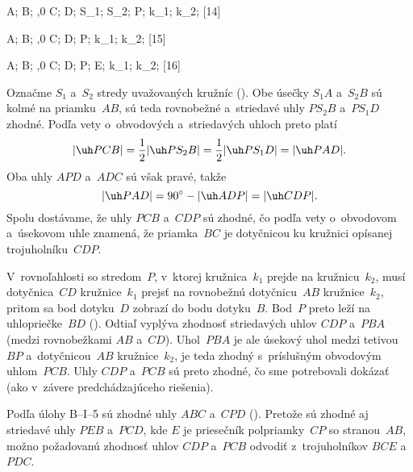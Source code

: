 {%
\fontplace
\tpoint A; \tpoint B; \bpoint{},0 C; \bpoint D;
\rpoint S_1; \lBpoint S_2; \tlpoint P;
\tlpoint k_1; \tlpoint k_2;
[14] \hfil\Obr

\fontplace
\tpoint A; \tpoint B; \bpoint{},0 C; \bpoint D;
\trpoint P;
\tlpoint k_1; \tlpoint k_2;
[15] \hfil\Obr

\fontplace
\tpoint A; \tpoint B; \bpoint{},0 C; \bpoint D;
\lpoint P; \tpoint E;
\tlpoint k_1; \tlpoint k_2;
[16] \hfil\Obr

Označme $S_1$ a~$S_2$ stredy uvažovaných kružníc
(\obr). Obe úsečky $S_1A$ a~$S_2B$ sú kolmé na priamku~$AB$,
\inspicture{}
sú teda rovnobežné a~striedavé uhly $PS_2B$ a~$PS_1D$
zhodné. Podľa vety 
o~obvodových a~striedavých uhloch preto platí
$$
|\uh PCB|=\frac12|\uh PS_2B|=\frac12|\uh PS_1D|=|\uh PAD|.
$$
Oba uhly $APD$ a~$ADC$ sú však pravé, takže
$$
|\uh PAD|=90^{\circ}-|\uh ADP|=|\uh CDP|.
$$
Spolu dostávame, že uhly $PCB$ a~$CDP$ sú zhodné, čo podľa
vety o~obvodovom a~úsekovom uhle znamená, že priamka~$BC$ je
dotyčnicou ku kružnici opísanej trojuholníku~$CDP$.

\ineriesenie
V~rovnoľahlosti so stredom~$P$, v~ktorej
kružnica~$k_1$ prejde na kružnicu~$k_2$, musí dotyčnica~$CD$
kružnice~$k_1$ prejsť na rovnobežnú dotyčnicu~$AB$ kružnice~$k_2$, pritom sa bod
dotyku~$D$ zobrazí do bodu dotyku~$B$. Bod~$P$ preto leží na
uhlopriečke~$BD$ (\obr). Odtiaľ vyplýva zhodnosť striedavých uhlov $CDP$
a~$PBA$ (medzi rovnobežkami $AB$ a~$CD$).
Uhol~$PBA$ je ale úsekový uhol medzi tetivou~$BP$ a~dotyčnicou~$AB$
kružnice~$k_2$, je teda zhodný s~príslušným obvodovým uhlom~$PCB$.
Uhly $CDP$ a~$PCB$ sú preto zhodné, čo sme potrebovali
dokázať (ako v~závere predchádzajúceho riešenia).
\inspicture{}

\poznamka
Podľa úlohy B--I--5 sú zhodné uhly $ABC$ a~$CPD$ (\obr).
\inspicture{}
Pretože sú zhodné aj striedavé uhly $PEB$ a~$PCD$, kde $E$ je
priesečník polpriamky~$CP$ so stranou~$AB$, možno požadovanú zhodnosť
uhlov $CDP$ a~$PCB$ odvodiť z~trojuholníkov $BCE$ a~$PDC$.}

